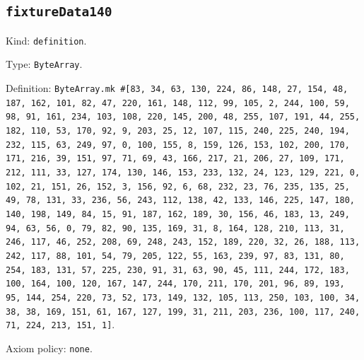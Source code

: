 \documentclass[11pt]{article}
\begin{document}
\subsection*{\texttt{fixtureData140}}
\noindent Kind: \texttt{definition}.\par
\noindent Type: \texttt{ByteArray}.\par
\noindent Definition: \texttt{ByteArray.mk \#[83, 34, 63, 130, 224, 86, 148, 27, 154, 48, 187, 162, 101, 82, 47, 220, 161, 148, 112, 99, 105, 2, 244, 100, 59, 98, 91, 161, 234, 103, 108, 220, 145, 200, 48, 255, 107, 191, 44, 255, 182, 110, 53, 170, 92, 9, 203, 25, 12, 107, 115, 240, 225, 240, 194, 232, 115, 63, 249, 97, 0, 100, 155, 8, 159, 126, 153, 102, 200, 170, 171, 216, 39, 151, 97, 71, 69, 43, 166, 217, 21, 206, 27, 109, 171, 212, 111, 33, 127, 174, 130, 146, 153, 233, 132, 24, 123, 129, 221, 0, 102, 21, 151, 26, 152, 3, 156, 92, 6, 68, 232, 23, 76, 235, 135, 25, 49, 78, 131, 33, 236, 56, 243, 112, 138, 42, 133, 146, 225, 147, 180, 140, 198, 149, 84, 15, 91, 187, 162, 189, 30, 156, 46, 183, 13, 249, 94, 63, 56, 0, 79, 82, 90, 135, 169, 31, 8, 164, 128, 210, 113, 31, 246, 117, 46, 252, 208, 69, 248, 243, 152, 189, 220, 32, 26, 188, 113, 242, 117, 88, 101, 54, 79, 205, 122, 55, 163, 239, 97, 83, 131, 80, 254, 183, 131, 57, 225, 230, 91, 31, 63, 90, 45, 111, 244, 172, 183, 100, 164, 100, 120, 167, 147, 244, 170, 211, 170, 201, 96, 89, 193, 95, 144, 254, 220, 73, 52, 173, 149, 132, 105, 113, 250, 103, 100, 34, 38, 38, 169, 151, 61, 167, 127, 199, 31, 211, 203, 236, 100, 117, 240, 71, 224, 213, 151, 1]}.\par
\noindent Axiom policy: \texttt{none}.\par
\end{document}
